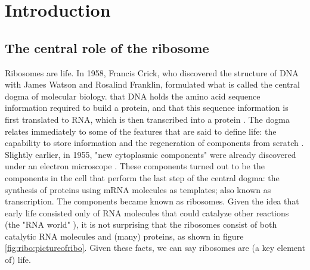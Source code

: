 
\section{Introduction}

\subsection{The central role of the ribosome}

Ribosomes are life.
%
In 1958, Francis Crick, who discovered the structure of DNA with James Watson and Rosalind Franklin,
formulated what is called the central dogma of molecular biology.
that DNA holds the amino acid sequence information required to build a protein, and that this sequence information is first translated to RNA, which is then transcribed into a protein \cite{Crick1958}.
% 
The dogma relates immediately to some of the features that are said to define life: 
the capability to store information and 
the regeneration of components from scratch \cite{Lawrence2005, Koshland2002}.
%
Slightly earlier, in 1955, "new cytoplasmic components" were already discovered under an electron microscope \cite{Palade1955}.
These components turned out to be the components in the cell that perform the last step of the central dogma: 
the synthesis of proteins using mRNA molecules as templates; also known as transcription.
The components became known as ribosomes.
%
Given the idea that early life consisted only of RNA molecules that could catalyze other reactions (the "RNA world" \cite{Campbell2002}), it is not surprising that the ribosomes 
consist of both catalytic RNA molecules and (many) proteins,
as shown in figure \ref{fig:ribo:pictureofribo}.
%
Given these facts, we can say ribosomes are (a key element of) life.


